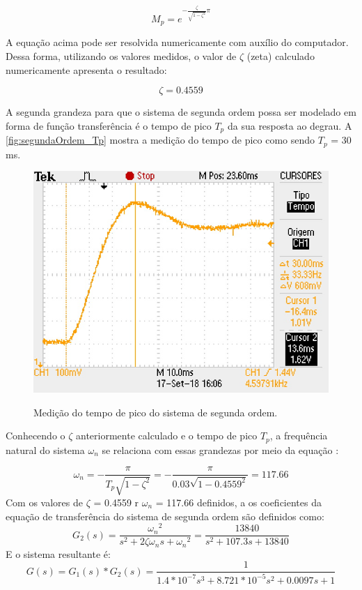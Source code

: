 \documentclass[
	article,			%
	11pt,				%
	oneside,			%
	a4paper,			%
	english,			%
	brazil,				%
	sumario=tradicional
	]{abntex2}
\begin{document}
$$
	M_{p} = e^{-\frac{\zeta}{\sqrt{1-\zeta^2}}\pi}
$$

A equação acima pode ser resolvida numericamente com auxílio do computador. Dessa forma, utilizando os valores medidos, o valor de $\zeta$ (zeta) calculado numericamente apresenta o resultado:

$$
	\zeta = 0.4559
$$

\pagebreak

A segunda grandeza para que o sistema de segunda ordem possa ser modelado em forma de função transferência é o tempo de pico $T_{p}$ da sua resposta ao degrau. A \autoref{fig:segundaOrdem_Tp} mostra a medição do tempo de pico como sendo $T_{p}$ = 30 ms.

\begin{figure}[htb!]
	\centering
	\caption{Medição do tempo de pico do sistema de segunda ordem.}
	\includegraphics[scale=1.4]{./img/segundaOrdem_Tp.JPG}
	\label{fig:segundaOrdem_Tp}
\end{figure}

Conhecendo o $\zeta$ anteriormente calculado e o tempo de pico $T_{p}$, a frequência natural do sistema $\omega_n$ se relaciona com essas grandezas por meio da equação \cite{Ogata2014}:

$$
	\omega_n = -\frac{\pi}{T_{p}\sqrt{1-\zeta^2}} = -\frac{\pi}{0.03\sqrt{1-0.4559^2}} = 117.66
$$
Com os valores de $\zeta$ = 0.4559 r $\omega_n$ = 117.66 definidos, a os coeficientes da equação de transferência do sistema de segunda ordem são definidos como:
$$
	G_{2}(s) = \frac{{\omega_n}^2}{s^2 + 2\zeta\omega_ns + {\omega_n}^2} = \frac{13840}{s^2 + 107.3s + 13840}
$$
E o sistema resultante é:
$$
	G(s) = G_{1}(s)*G_{2}(s) = \frac{1}{1.4*10^{-7} s^3 + 8.721*10^{-5} s^2 + 0.0097 s + 1}
$$
\end{document}
